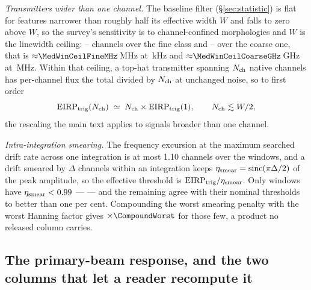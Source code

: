 \emph{Transmitters wider than one channel.} The baseline filter
(\S\ref{sec:statistic}) is flat for features narrower than roughly half its
effective width $W$ and falls to zero above $W$, so the survey's sensitivity
is to channel-confined morphologies and $W$ is the linewidth ceiling:
\MedWinFineLo--\MedWinFineHi{} channels over the fine class and
\MedWinCoarseLo--\MedWinCoarseHi{} over the coarse one, that is
${\approx}\MedWinCeilFineMHz$\,MHz at \ChanFineKHz\,kHz and
${\approx}\MedWinCeilCoarseGHz$\,GHz at \ChanCoarseMHz\,MHz. Within that
ceiling, a top-hat transmitter spanning $N_{\rm ch}$ native channels has
per-channel flux the total divided by $N_{\rm ch}$ at unchanged noise, so to
first order
\begin{equation}
\mathrm{EIRP}_{\rm trig}(N_{\rm ch}) \;\simeq\; N_{\rm ch}\times
\mathrm{EIRP}_{\rm trig}(1), \qquad N_{\rm ch} \lesssim W/2,
\end{equation}
the rescaling the main text applies to signals broader than one channel.

\emph{Intra-integration smearing.} The frequency excursion at the maximum
searched drift rate across one integration is at most 1.10 channels over the
\NWindows{} windows, and a drift smeared by $\Delta$ channels within an
integration keeps $\eta_{\rm smear}=\mathrm{sinc}(\pi\Delta/2)$ of the peak
amplitude, so the effective threshold is
$\mathrm{EIRP}_{\rm trig}/\eta_{\rm smear}$. Only \NSmearLo{} windows have
$\eta_{\rm smear}<0.99$ --- \SmearList{} --- and the remaining \NSmearOk{}
agree with their nominal thresholds to better than one per cent. Compounding
the worst smearing penalty with the worst Hanning factor gives
$\times\CompoundWorst$ for those few, a product no released column carries.

\subsection{The primary-beam response, and the two columns that let a reader
recompute it}

